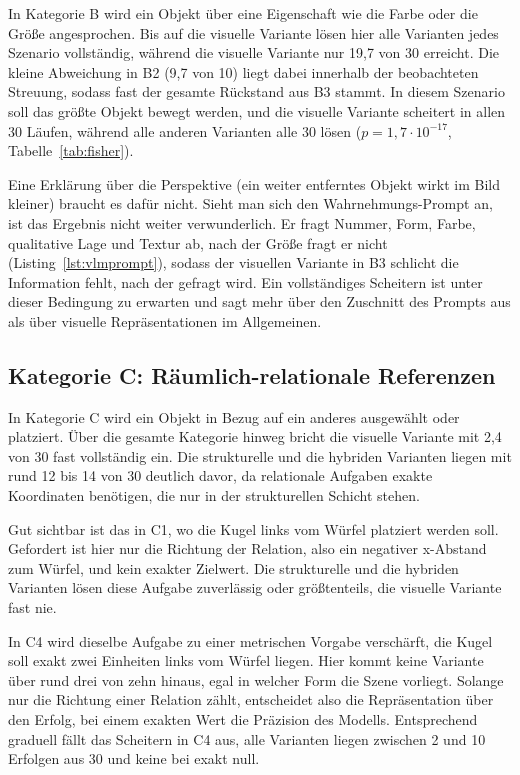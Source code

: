 In Kategorie B wird ein Objekt über eine Eigenschaft wie die Farbe oder die Größe angesprochen.
Bis auf die visuelle Variante lösen hier alle Varianten jedes Szenario vollständig, während die visuelle Variante nur 19,7 von 30 erreicht.
Die kleine Abweichung in B2 (9,7 von 10) liegt dabei innerhalb der beobachteten Streuung, sodass fast der gesamte Rückstand aus B3 stammt.
In diesem Szenario soll das größte Objekt bewegt werden, und die visuelle Variante scheitert in allen 30 Läufen, während alle anderen Varianten alle 30 lösen ($p = 1{,}7\cdot10^{-17}$, Tabelle~\ref{tab:fisher}).

Eine Erklärung über die Perspektive (ein weiter entferntes Objekt wirkt im Bild kleiner) braucht es dafür nicht.
Sieht man sich den Wahrnehmungs-Prompt an, ist das Ergebnis nicht weiter verwunderlich.
Er fragt Nummer, Form, Farbe, qualitative Lage und Textur ab, nach der Größe fragt er nicht (Listing~\ref{lst:vlmprompt}), sodass der visuellen Variante in B3 schlicht die Information fehlt, nach der gefragt wird.
Ein vollständiges Scheitern ist unter dieser Bedingung zu erwarten und sagt mehr über den Zuschnitt des Prompts aus als über visuelle Repräsentationen im Allgemeinen.

\subsection*{Kategorie C: Räumlich-relationale Referenzen}

In Kategorie C wird ein Objekt in Bezug auf ein anderes ausgewählt oder platziert.
Über die gesamte Kategorie hinweg bricht die visuelle Variante mit 2,4 von 30 fast vollständig ein.
Die strukturelle und die hybriden Varianten liegen mit rund 12 bis 14 von 30 deutlich davor, da relationale Aufgaben exakte Koordinaten benötigen, die nur in der strukturellen Schicht stehen.

Gut sichtbar ist das in C1, wo die Kugel links vom Würfel platziert werden soll.
Gefordert ist hier nur die Richtung der Relation, also ein negativer x-Abstand zum Würfel, und kein exakter Zielwert.
Die strukturelle und die hybriden Varianten lösen diese Aufgabe zuverlässig oder größtenteils, die visuelle Variante fast nie.

In C4 wird dieselbe Aufgabe zu einer metrischen Vorgabe verschärft, die Kugel soll exakt zwei Einheiten links vom Würfel liegen.
Hier kommt keine Variante über rund drei von zehn hinaus, egal in welcher Form die Szene vorliegt.
Solange nur die Richtung einer Relation zählt, entscheidet also die Repräsentation über den Erfolg, bei einem exakten Wert die Präzision des Modells.
Entsprechend graduell fällt das Scheitern in C4 aus, alle Varianten liegen zwischen 2 und 10 Erfolgen aus 30 und keine bei exakt null.

